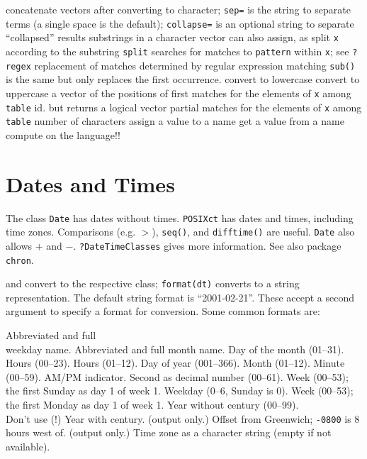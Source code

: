 	{concatenate vectors after converting to character; {\tt sep=} is the string to separate terms (a single space is the default); {\tt collapse=} is an optional string to separate ``collapsed'' results}
	{substrings in a character vector}
	{can also assign, as}
	{split {\tt x} according to the substring {\tt split}}
	{searches for matches to {\tt pattern} within {\tt x}; see {\tt ?regex}}
	{replacement of matches determined by regular expression matching {\tt sub()} is the same but only replaces the first occurrence.}
	{convert to lowercase}
	{convert to uppercase}
	{a vector of the positions of first matches for the elements of {\tt x} among {\tt table}}
	{id. but returns a logical vector}
	{partial matches for the elements of {\tt x} among {\tt table}}
	{number of characters}
	{assign a value to a name}
	{get a value from a name}
	{compute on the language!!}

\section{Dates and Times}{
The class {\tt Date} has dates without times.  {\tt POSIXct} has
dates and times, including time zones. Comparisons (e.g. $>$),
{\tt seq()}, and {\tt difftime()} are useful. {\tt Date} also allows
$+$ and $-$. {\tt ?DateTimeClasses} gives more information. See also package
{\tt chron}.}

	{and}
	{convert to the respective class; {\tt format(dt)} converts to a string representation. The default string format is ``2001-02-21''. These accept a second argument to specify a format for conversion. Some common formats are:}


    	{Abbreviated and full \\weekday name.}
    	{Abbreviated and full month name.}
    	{Day of the month (01--31).}
    	{Hours (00--23).}
    	{Hours (01--12).}
    	{Day of year (001--366).}
    	{Month (01--12).}
    	{Minute (00--59).}
    	{AM/PM indicator. }
    	{Second as decimal number (00--61).}
    	{Week (00--53); the first Sunday as day 1 of week 1.}
    	{Weekday (0--6, Sunday is 0).}
    	{Week (00--53); the first Monday as day 1 of week 1.}
    	{Year without century (00--99).\\Don't use (!)}
    	{Year with century.}
    	{(output only.) Offset from Greenwich; {\tt -0800} is 8 hours west of.}
    	{(output only.) Time zone as a character
      string (empty if not available).}

